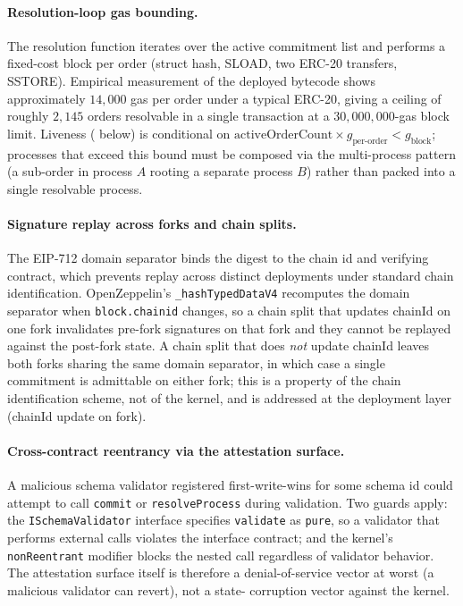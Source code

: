 \documentclass[11pt,a4paper]{article}
\theoremstyle{definition}
\theoremstyle{remark}
\begin{document}
\paragraph{Resolution-loop gas bounding.}
The resolution function iterates over the active commitment list and
performs a fixed-cost block per order (struct hash, SLOAD, two
ERC-20 transfers, SSTORE). Empirical measurement of the deployed
bytecode shows approximately $14{,}000$ gas per order under a typical
ERC-20, giving a ceiling of roughly $2{,}145$ orders resolvable in a
single transaction at a $30{,}000{,}000$-gas block limit. Liveness
( below) is conditional on
$\text{activeOrderCount} \times g_{\text{per-order}} < g_{\text{block}}$;
processes that exceed this bound must be composed via the
multi-process pattern (a sub-order in process $A$ rooting a separate
process $B$) rather than packed into a single resolvable process.

\paragraph{Signature replay across forks and chain splits.}
The EIP-712 domain separator binds the digest to the chain id and
verifying contract, which prevents replay across distinct
deployments under standard chain identification. OpenZeppelin's
\texttt{\_hashTypedDataV4} recomputes the domain separator when
\texttt{block.chainid} changes, so a chain split that updates
chainId on one fork invalidates pre-fork signatures on that fork
and they cannot be replayed against the post-fork state. A chain
split that does \emph{not} update chainId leaves both forks
sharing the same domain separator, in which case a single
commitment is admittable on either fork; this is a property of
the chain identification scheme, not of the kernel, and is
addressed at the deployment layer (chainId update on fork).

\paragraph{Cross-contract reentrancy via the attestation surface.}
A malicious schema validator registered first-write-wins for some
schema id could attempt to call \texttt{commit} or
\texttt{resolveProcess} during validation. Two guards apply: the
\texttt{ISchemaValidator} interface specifies \texttt{validate} as
\texttt{pure}, so a validator that performs external calls violates
the interface contract; and the kernel's \texttt{nonReentrant}
modifier blocks the nested call regardless of validator behavior.
The attestation surface itself is therefore a denial-of-service
vector at worst (a malicious validator can revert), not a state-
corruption vector against the kernel.
\end{document}
